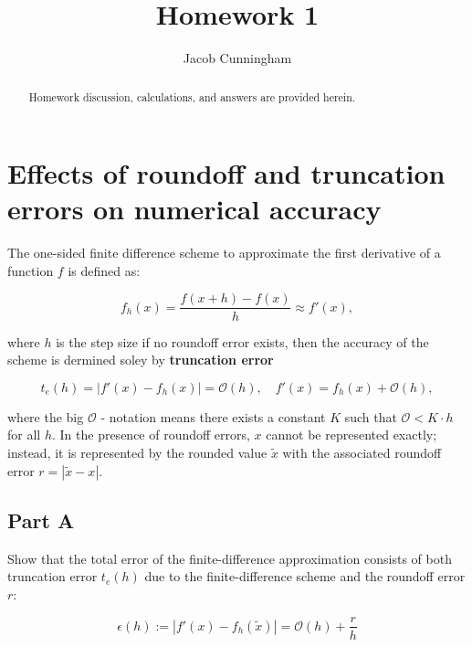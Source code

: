 \documentclass{article}
\title{Homework 1}
\date{\displaydate{articleDate}}
\author{Jacob Cunningham\footnotemark[1]\\
}
\begin{document}
\maketitle
{}

\begin{abstract}
Homework discussion, calculations, and answers are provided herein.
\end{abstract}


\section{Effects of roundoff and truncation errors on numerical accuracy}

The one-sided finite difference scheme to approximate the first derivative of a function $f$ is defined as:

\begin{equation}
\label{equ-osfd}
f_{h}(x) = \frac{f(x + h) - f(x)}{h} \approx f'(x),
\end{equation}

where $h$ is the step size if no roundoff error exists, then the accuracy of the scheme is dermined soley by \textbf{truncation error}

\begin{equation}
\label{equ-truncation-error}
t_{e}(h) = | f'(x) - f_{h}(x) | = \mathscr{O}(h),
  \quad
  f'(x) = f_{h}(x) + \mathscr{O}(h),
\end{equation}

where the big $\mathscr{O}$ - notation means there exists a constant $K$ such that $\mathscr{O} < K \cdot h$ for all $h$. In the presence of roundoff errors, $x$ cannot be represented exactly; instead, it is represented by the rounded value $\tilde{x}$ with the associated roundoff error $r = |\tilde{x} - x |$.

\subsection{Part A}

Show that the total error of the finite-difference approximation consists of both truncation error $t_{e}(h)$ due to the finite-difference scheme and the roundoff error $r$:

\begin{equation}
\label{equ-fd-error}
\epsilon (h) := |f'(x) - f_{h}(\tilde{x})| = \mathscr{O}(h) + \frac{r}{h}
\end{equation}
\end{document}
